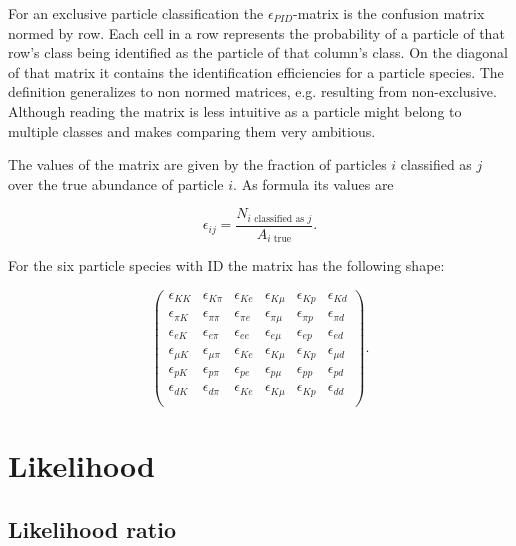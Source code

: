 For an exclusive particle classification the $\epsilon_{PID}$-matrix is the confusion matrix normed by row. Each cell in a row represents the probability of a particle of that row's class being identified as the particle of that column's class. On the diagonal of that matrix it contains the identification efficiencies for a particle species.
The definition generalizes to non normed matrices, e.g. resulting from non-exclusive. Although reading the matrix is less intuitive as a particle might belong to multiple classes and makes comparing them very ambitious.

The values of the matrix are given by the fraction of particles $i$ classified as $j$ over the true abundance of particle $i$. As formula its values are

\begin{equation}
	\epsilon_{i j} = \frac{N_{i \text{ classified as } j}}{A_{i \text{ true}}}.
\end{equation}

For the six particle species with ID the matrix has the following shape:

\begin{equation}
	\begin{pmatrix}
		\epsilon_{K K} & \epsilon_{K \pi} & \epsilon_{K e} & \epsilon_{K \mu} & \epsilon_{K p} & \epsilon_{K d} \\
		\epsilon_{\pi K} & \epsilon_{\pi \pi} & \epsilon_{\pi e} & \epsilon_{\pi \mu} & \epsilon_{\pi p} & \epsilon_{\pi d} \\
		\epsilon_{e K} & \epsilon_{e \pi} & \epsilon_{e e} & \epsilon_{e \mu} & \epsilon_{e p} & \epsilon_{e d} \\
		\epsilon_{\mu K} & \epsilon_{\mu \pi} & \epsilon_{K e} & \epsilon_{K \mu} & \epsilon_{K p} & \epsilon_{\mu d} \\
		\epsilon_{p K} & \epsilon_{p \pi} & \epsilon_{p e} & \epsilon_{p \mu} & \epsilon_{p p} & \epsilon_{p d} \\
		\epsilon_{d K} & \epsilon_{d \pi} & \epsilon_{K e} & \epsilon_{K \mu} & \epsilon_{K p} & \epsilon_{d d} \\
	\end{pmatrix}.
\end{equation}

\section{Likelihood}
\label{sec:likelihood}

\subsection{Likelihood ratio}
\label{subsec:likelihood_ratios}

